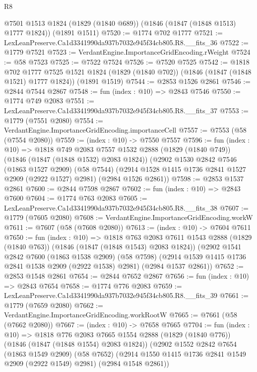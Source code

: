 \begin{lexlean}{R8}
\begin{coremodule}
    @7501
    @1513
    @1824
    (@1829 (@1840 @689))
    (@1846 (@1847 (@1848 @1513) @1777 @1824))
    (@1891 @1511)
@7520 := @1774 @702 @1777
@7521 := LexLeanPreserve.Ca1d3341990da937b7032e945f34cb805.R8.__fits_36
@7522 := @1779 @7521
@7523 := VerdantEngine.ImportanceGridEncoding.rWeight
@7524 := @58 @7523
@7525 := @7522 @7524
@7526 := @7520 @7525
@7542 := @1818
    @702
    @1777
    @7525
    @1521
    @1824
    (@1829 (@1840 @702))
    (@1846 (@1847 (@1848 @1521) @1777 @1824))
    (@1891 @1519)
@7544 := @2853 @1526 @2861
@7546 := @2844 @7544 @2867
@7548 := fun (index : @10) => @2843 @7546
@7550 := @1774 @749 @2083
@7551 := LexLeanPreserve.Ca1d3341990da937b7032e945f34cb805.R8.__fits_37
@7553 := @1779 (@7551 @2080)
@7554 := VerdantEngine.ImportanceGridEncoding.importanceCell
@7557 := @7553 (@58 (@7554 @2080))
@7559 := (index : @10) -> @7550 @7557
@7596 := fun (index : @10) =>
  @1818
    @749
    @2083
    @7557
    @1532
    @2888
    (@1829 (@1840 @749))
    (@1846 (@1847 (@1848 @1532) @2083 @1824))
    (@2902
      @1530
      @2842
      @7546
      (@1863 @1527 @2909)
      (@58 @7544)
      (@2914 @1528 @1415 @1736 @2841 @1527 @2909 (@2922 @1527) @2981)
      (@2984 @1526 @2861))
@7598 := @2853 @1537 @2861
@7600 := @2844 @7598 @2867
@7602 := fun (index : @10) => @2843 @7600
@7604 := @1774 @763 @2083
@7605 := LexLeanPreserve.Ca1d3341990da937b7032e945f34cb805.R8.__fits_38
@7607 := @1779 (@7605 @2080)
@7608 := VerdantEngine.ImportanceGridEncoding.workW
@7611 := @7607 (@58 (@7608 @2080))
@7613 := (index : @10) -> @7604 @7611
@7650 := fun (index : @10) =>
  @1818
    @763
    @2083
    @7611
    @1543
    @2888
    (@1829 (@1840 @763))
    (@1846 (@1847 (@1848 @1543) @2083 @1824))
    (@2902
      @1541
      @2842
      @7600
      (@1863 @1538 @2909)
      (@58 @7598)
      (@2914 @1539 @1415 @1736 @2841 @1538 @2909 (@2922 @1538) @2981)
      (@2984 @1537 @2861))
@7652 := @2853 @1548 @2861
@7654 := @2844 @7652 @2867
@7656 := fun (index : @10) => @2843 @7654
@7658 := @1774 @776 @2083
@7659 := LexLeanPreserve.Ca1d3341990da937b7032e945f34cb805.R8.__fits_39
@7661 := @1779 (@7659 @2080)
@7662 := VerdantEngine.ImportanceGridEncoding.workRootW
@7665 := @7661 (@58 (@7662 @2080))
@7667 := (index : @10) -> @7658 @7665
@7704 := fun (index : @10) =>
  @1818
    @776
    @2083
    @7665
    @1554
    @2888
    (@1829 (@1840 @776))
    (@1846 (@1847 (@1848 @1554) @2083 @1824))
    (@2902
      @1552
      @2842
      @7654
      (@1863 @1549 @2909)
      (@58 @7652)
      (@2914 @1550 @1415 @1736 @2841 @1549 @2909 (@2922 @1549) @2981)
      (@2984 @1548 @2861))

\end{coremodule}
\end{lexlean}
